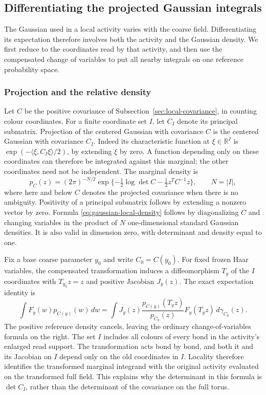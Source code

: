\subsection{Differentiating the projected Gaussian integrals}
\label{sec:gaussian-differentiation}
The Gaussian used in a local activity varies with the coarse field.
Differentiating its expectation therefore involves both the activity
and the Gaussian density. We first reduce to the coordinates read by
that activity, and then use the compensated change of variables to
put all nearby integrals on one reference probability space.

\subsubsection{Projection and the relative density}
Let $C$ be the positive covariance of
Subsection~\ref{sec:local-covariance}, in counting colour coordinates.
For a finite coordinate set $I$, let $C_I$ denote its principal
submatrix. Projection of the centered Gaussian with covariance $C$
is the centered Gaussian with covariance $C_I$. Indeed its
characteristic function at $\xi\in\mathbb R^I$ is
$\exp(-\langle\xi,C_I\xi\rangle/2)$, by extending $\xi$ by
zero. A function depending only on these coordinates can therefore
be integrated against this marginal; the other coordinates need
not be independent. The marginal density is
\begin{equation}\label{eq:gaussian-local-density}
 p_C(z)=(2\pi)^{-N/2}
   \exp\{-\tfrac12\log\det C-\tfrac12 z^TC^{-1}z\},
 \qquad N=|I|,
\end{equation}
where here and below $C$ denotes the projected covariance when
there is no ambiguity. Positivity of a principal submatrix follows
by extending a nonzero vector by zero. Formula
\eqref{eq:gaussian-local-density} follows by diagonalizing $C$ and
changing variables in the product of $N$ one-dimensional standard
Gaussian densities. It is also valid in dimension zero, with
determinant and density equal to one.

Fix a base coarse parameter $y_0$ and write $C_0=C(y_0)$. For fixed
frozen Haar variables, the compensated transformation induces a
diffeomorphism $T_y$ of the $I$ coordinates with $T_{y_0}z=z$ and
positive Jacobian $J_y(z)$. The exact expectation identity is
\begin{equation}\label{eq:gaussian-relative-identity}
 \int F_y(w)p_{C(y)}(w)\,dw
 =\int J_y(z)\frac{p_{C(y)}(T_yz)}{p_{C_0}(z)}
                  F_y(T_yz)\,d\gamma_{C_0}(z).
\end{equation}
The positive reference density cancels, leaving the ordinary
change-of-variables formula on the right. The set $I$ includes all
colours of every bond in the activity's enlarged read support.
The transformation acts bond by bond, and both it and its Jacobian
on $I$ depend only on the old coordinates in $I$. Locality therefore
identifies the transformed marginal integrand with the original
activity evaluated on the transformed full field. This explains
why the determinant in this formula is $\det C_I$, rather than the
determinant of the covariance on the full torus.

